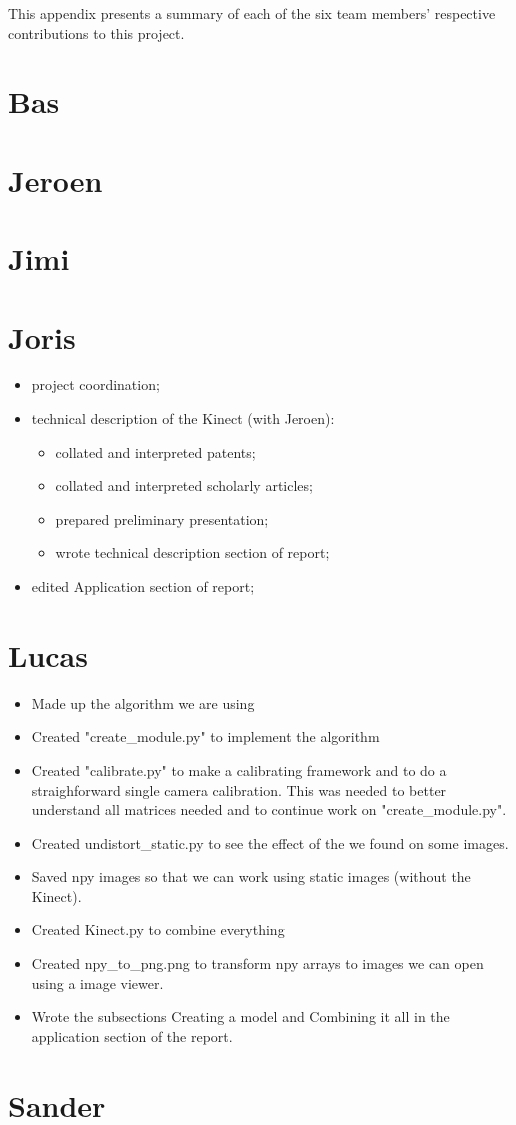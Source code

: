 This appendix presents a summary of each of the six team members' respective
contributions to this project.


\section{Bas}


\section{Jeroen}


\section{Jimi}


\section{Joris}

\begin{itemize}
    \item project coordination;
    \item technical description of the Kinect (with Jeroen):
    \begin{itemize}
        \item collated and interpreted patents;
        \item collated and interpreted scholarly articles;
        \item prepared preliminary presentation;
        \item wrote technical description section of report;
    \end{itemize}
    \item edited Application section of report;
\end{itemize}


\section{Lucas}
\begin{itemize}
\item Made up the algorithm we are using
\item Created "create\_module.py" to implement the algorithm
\item Created "calibrate.py" to make a calibrating framework and to do a 
straighforward single camera calibration. This was needed to better understand 
all matrices needed and to continue work on "create\_module.py".
\item Created undistort\_static.py to see the effect of the we found on some images.
\item Saved npy images so that we can work using static images (without the Kinect).
\item Created Kinect.py to combine everything
\item Created npy\_to\_png.png to transform npy arrays to images we can open 
using a image viewer.
\item Wrote the subsections Creating a model and Combining it all in the 
application section of the report.
\end{itemize}
\section{Sander}

